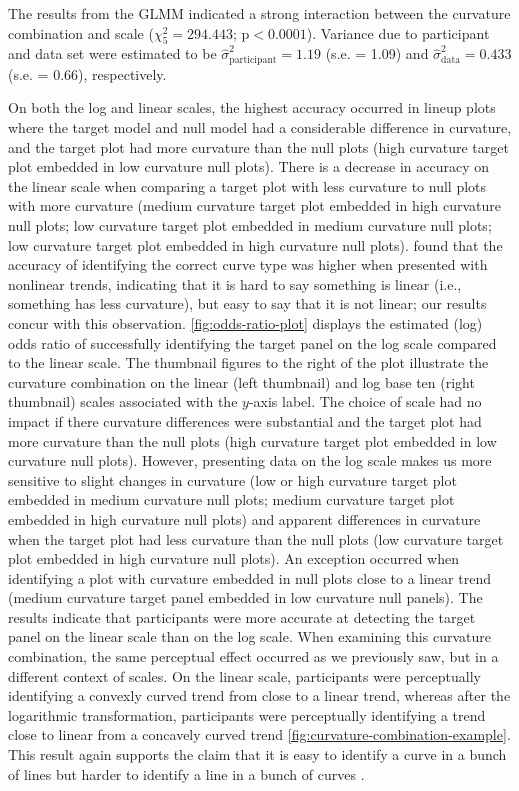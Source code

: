 \documentclass[12pt]{article}
\begin{document}
The results from the GLMM indicated a strong interaction between the
curvature combination and scale (\(\chi^2_5 = 294.443\);
\(\text{p} <0.0001\)). Variance due to participant and data set were
estimated to be \(\hat\sigma^2_{\text{participant}} = 1.19\) (s.e. =
1.09) and \(\hat\sigma^2_{\text{data}} = 0.433\) (s.e. = 0.66),
respectively.

On both the log and linear scales, the highest accuracy occurred in
lineup plots where the target model and null model had a considerable
difference in curvature, and the target plot had more curvature than the
null plots (high curvature target plot embedded in low curvature null
plots). There is a decrease in accuracy on the linear scale when
comparing a target plot with less curvature to null plots with more
curvature (medium curvature target plot embedded in high curvature null
plots; low curvature target plot embedded in medium curvature null
plots; low curvature target plot embedded in high curvature null plots).
\citet{best_perception_2007} found that the accuracy of identifying the
correct curve type was higher when presented with nonlinear trends,
indicating that it is hard to say something is linear (i.e., something
has less curvature), but easy to say that it is not linear; our results
concur with this observation. \cref{fig:odds-ratio-plot} displays the
estimated (log) odds ratio of successfully identifying the target panel
on the log scale compared to the linear scale. The thumbnail figures to
the right of the plot illustrate the curvature combination on the linear
(left thumbnail) and log base ten (right thumbnail) scales associated
with the \(y\)-axis label. The choice of scale had no impact if there
curvature differences were substantial and the target plot had more
curvature than the null plots (high curvature target plot embedded in
low curvature null plots). However, presenting data on the log scale
makes us more sensitive to slight changes in curvature (low or high
curvature target plot embedded in medium curvature null plots; medium
curvature target plot embedded in high curvature null plots) and
apparent differences in curvature when the target plot had less
curvature than the null plots (low curvature target plot embedded in
high curvature null plots). An exception occurred when identifying a
plot with curvature embedded in null plots close to a linear trend
(medium curvature target panel embedded in low curvature null panels).
The results indicate that participants were more accurate at detecting
the target panel on the linear scale than on the log scale. When
examining this curvature combination, the same perceptual effect
occurred as we previously saw, but in a different context of scales. On
the linear scale, participants were perceptually identifying a convexly
curved trend from close to a linear trend, whereas after the logarithmic
transformation, participants were perceptually identifying a trend close
to linear from a concavely curved trend
\cref{fig:curvature-combination-example}. This result again supports the
claim that it is easy to identify a curve in a bunch of lines but harder
to identify a line in a bunch of curves \citep{best_perception_2007}.
\end{document}
